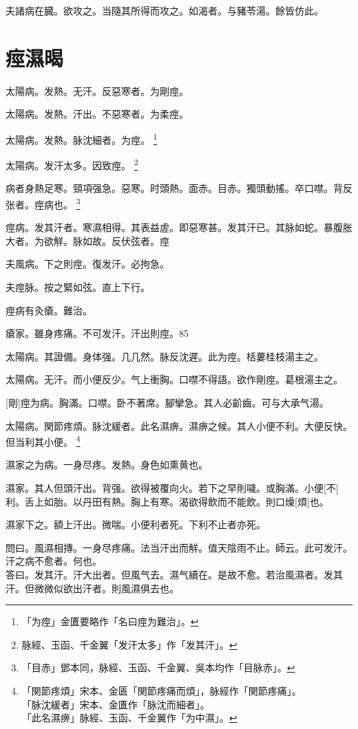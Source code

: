 \documentclass[12pt,twoside,UTF8,b5paper]{ctexbook}
\begin{document}
夫諸病在臓。欲攻之。当隨其所得而攻之。如渴者。与豬苓湯。餘皆仿此。

\chapter{痙濕暍}

太陽病。发熱。无汗。反惡寒者。为剛痙。

太陽病。发熱。汗出。不惡寒者。为柔痙。

太陽病。发熱。脉沈細者。为痙。
	\footnote{「为痙」金匱要略作「名曰痙为難治」。}

太陽病。发汗太多。因致痙。
	\footnote{脉經、玉函、千金翼「发汗太多」作「发其汗」。}

病者身熱足寒。頸項强急。惡寒。时頭熱。面赤。目赤。獨頭動搖。卒口噤。背反张者。痙病也。
	\footnote{「目赤」鄧本同，脉經、玉函、千金翼、吳本均作「目脉赤」。}

痙病。发其汗者。寒濕相得。其表益虗。即惡寒甚。发其汗已。其脉如蛇。暴腹胀大者。为欲觧。脉如故。反伏弦者。痙

夫風病。下之則痙。復发汗。必拘急。

夫痙脉。按之緊如弦。直上下行。

痙病有灸瘡。難治。

瘡家。雖身疼痛。不可发汗。汗出則痙。85

太陽病。其證備。身体强。几几然。脉反沈遲。此为痙。栝蔞桂枝湯主之。

太陽病。无汗。而小便反少。气上衝胸。口噤不得語。欲作剛痙。葛根湯主之。

[剛]痙为病。胸滿。口噤。卧不著席。腳攣急。其人必齘齒。可与大承气湯。

太陽病。関節疼煩。脉沈緩者。此名濕痹。濕痹之候。其人小便不利。大便反快。但当利其小便。
	\footnote{「関節疼煩」宋本、金匮「関節疼痛而煩」，脉經作「関節疼痛」。\\「脉沈緩者」宋本、金匱作「脉沈而細者」。\\「此名濕痹」脉經、玉函、千金翼作「为中濕」。}

濕家之为病。一身尽疼。发熱。身色如熏黄也。

濕家。其人但頭汗出。背强。欲得被覆向火。若下之早則噦。或胸滿。小便[不]利。舌上如胎。以丹田有熱。胸上有寒。渴欲得飲而不能飲。則口燥[煩]也。

濕家下之。額上汗出。微喘。小便利者死。下利不止者亦死。

問曰。風濕相摶。一身尽疼痛。法当汗出而觧。值天陰雨不止。師云。此可发汗。汗之病不愈者。何也。\\
答曰。发其汗。汗大出者。但風气去。濕气續在。是故不愈。若治風濕者。发其汗。但微微似欲出汗者。則風濕俱去也。
\end{document}
